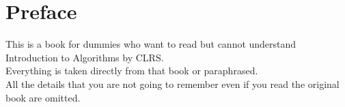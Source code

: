 \chapter{Preface}
This is a book for dummies who want to read but cannot understand Introduction to Algorithms by CLRS.\\
Everything is taken directly from that book or paraphrased.\\
All the details that you are not going to remember even if you read the original book are omitted. 
